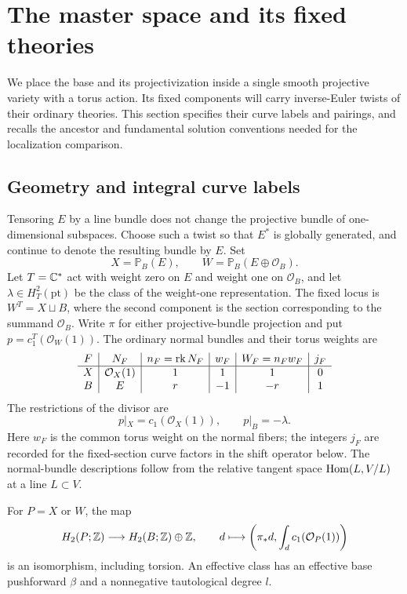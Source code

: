 \section{The master space and its fixed theories}\label{geo:section}

We place the base and its projectivization inside a single smooth
projective variety with a torus action.  Its fixed components will carry
inverse-Euler twists of their ordinary theories.  This section specifies
their curve labels and pairings, and recalls the ancestor and fundamental
solution conventions needed for the localization comparison.

\subsection{Geometry and integral curve labels}

Tensoring $E$ by a line bundle does not change the projective bundle of
one-dimensional subspaces.  Choose such a twist so that $E^*$ is globally
generated, and continue to denote the resulting bundle by $E$.
Set
\[
       X=\mathbb P_B(E),\qquad W=\mathbb P_B(E\oplus\mathcal O_B).
\]
Let $T=\mathbb C^*$ act with weight zero on $E$ and weight one on
$\mathcal O_B$, and let $\lambda\in H_T^2(\mathrm{pt})$ be the class of
the weight-one representation.  The fixed locus is
$W^T=X\sqcup B$, where the second component is the section corresponding
to the summand $\mathcal O_B$.
Write $\pi$ for either projective-bundle projection and put
$p=c_1^T(\mathcal O_W(1))$.  The ordinary normal bundles and their torus
weights are
\begin{equation}
\begin{array}{c|c|c|c|c|c}
 F&N_F&n_F=\operatorname{rk} N_F&w_F&W_F=n_Fw_F&j_F\\ \hline
 X&\mathcal O_X(1)&1&1&1&0\\
 B&E&r&-1&-r&1
\end{array}
\label{geo:normal-data}
\end{equation}
The restrictions of the divisor are
\[
              p|_X=c_1(\mathcal O_X(1)),\qquad p|_B=-\lambda.
\]
Here $w_F$ is the common torus weight on the normal fibers; the integers
$j_F$ are recorded for the fixed-section curve factors in the shift
operator below.  The normal-bundle descriptions follow from the relative
tangent space $\operatorname{Hom}(L,V/L)$ at a line $L\subset V$.

\begin{lemma}\label{geo:curve-labels}
For $P=X$ or $W$, the map
\begin{equation}
 H_2(P;\mathbb Z)\longrightarrow H_2(B;\mathbb Z)\oplus\mathbb Z,
 \qquad d\longmapsto
       \left(\pi_*d,\int_d c_1(\mathcal O_P(1))\right)
 \label{geo:integral-splitting}
\end{equation}
is an isomorphism, including torsion.  An effective class has an effective
base pushforward $\beta$ and a nonnegative tautological degree $l$.
\end{lemma}

